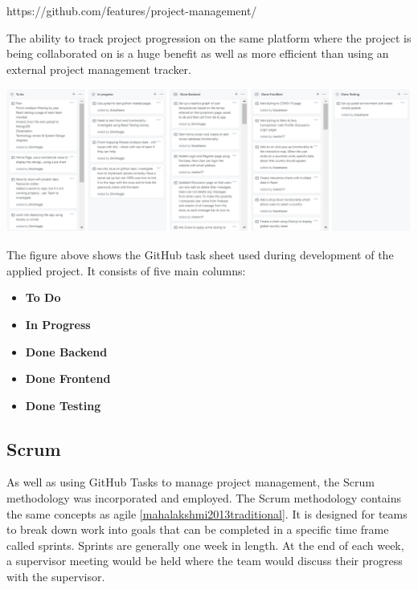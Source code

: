 https://github.com/features/project-management/

\vspace{50mm} %

The ability to track project progression on the same platform where the project is being collaborated on is a huge benefit as well as more efficient than using an external project management tracker. 

\begin{center}
      \includegraphics[scale=0.50]{img/GitHubToDo.PNG}
\end{center}
\label{fig:x Github Tasks}

The figure above shows the GitHub task sheet used during development of the applied project. It consists of five main columns:

\begin{itemize}
\item \textbf{To Do}
\item \textbf{In Progress}
\item \textbf{Done Backend}
\item \textbf{Done Frontend}
\item \textbf{Done Testing}
\end{itemize}

\subsection{Scrum}
As well as using GitHub Tasks to manage project management, the Scrum methodology was incorporated and employed. The Scrum methodology contains the same concepts as agile \ref{mahalakshmi2013traditional}. It is designed for teams to break down work into goals that can be completed in a specific time frame called sprints. Sprints are generally one week in length. At the end of each week, a supervisor meeting would be held where the team would discuss their progress with the supervisor.

\vspace{5mm} %


